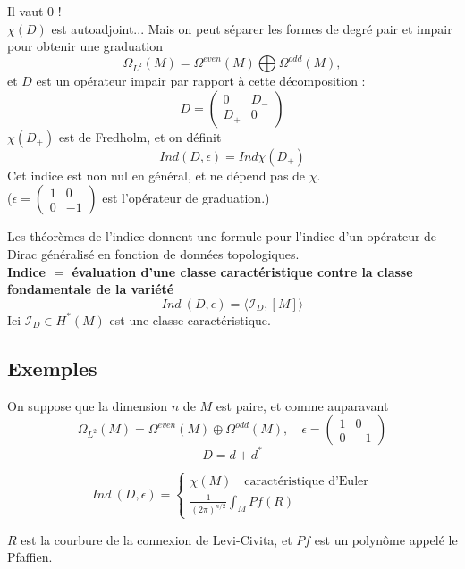 \documentclass{beamer}
\begin{document}
\begin{frame}
Il vaut $0$ ! \\
$\chi(D)$ est autoadjoint... Mais on peut séparer les formes de degré pair et impair pour obtenir une graduation
\[\Omega_{L^2}(M) = \Omega^{even}(M) \bigoplus \Omega^{odd}(M),\]
et $D$ est un opérateur impair par rapport à cette décomposition :
\[D= \begin{pmatrix}0 & D_-\\ D_+ & 0  \end{pmatrix}\]
$\chi(D_+)$ est de Fredholm, et on définit
\[Ind(D,\epsilon)=Ind\chi(D_+)\]
Cet indice est non nul en général, et ne dépend pas de $\chi$.\\
($\epsilon = \begin{pmatrix}1 & 0 \\ 0 & -1\end{pmatrix}$ est l'opérateur de graduation.)
\end{frame}

\begin{frame}
Les théorèmes de l'indice donnent une formule pour l'indice d'un opérateur de Dirac généralisé en fonction de données topologiques.\\
\textbf{Indice $=$ évaluation d'une classe caractéristique contre la classe fondamentale de la variété }
\[Ind \ (D,\epsilon) = \langle \mathcal I _D , [M]\rangle\]
Ici $\mathcal I _D\in H^*(M)$ est une classe caractéristique.
\end{frame}

\subsection{Exemples}
\begin{frame}%
On suppose que la dimension $n$ de $M$ est paire, et comme auparavant
\[\Omega_{L^2}(M)=\Omega^{even}(M)\oplus \Omega^{odd}(M),\quad \epsilon = \begin{pmatrix}1 & 0\\ 0 & -1 \end{pmatrix}\]
 \[D=d+d^*\]
\begin{thm}
\[Ind \ (D ,\epsilon) = \left\{\begin{array}{l} \chi(M)\quad \text{caractéristique d'Euler}\\ \frac{1}{(2\pi)^{n/2}}\int_M Pf(R)\end{array}\right.\]
\end{thm}
$R$ est la courbure de la connexion de Levi-Civita, et $Pf$ est un polynôme appelé le Pfaffien.
\end{frame}
\end{document}
